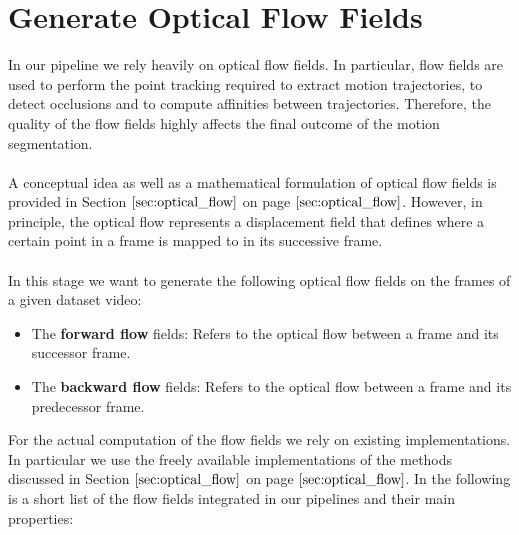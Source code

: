 \section{Generate Optical Flow Fields}
\label{sec:generate_of}
In our pipeline we rely heavily on optical flow fields. In particular, flow fields are used to perform the point tracking required to extract motion trajectories, to detect occlusions and to compute affinities between trajectories. Therefore, the quality of the flow fields highly affects the final outcome of the motion segmentation. \\ \\
A conceptual idea as well as a mathematical formulation of optical flow fields is provided in Section $\ref{sec:optical_flow}$ on page $\pageref{sec:optical_flow}$. However, in principle, the optical flow represents a displacement field that defines where a certain point in a frame is mapped to in its successive frame. \\ \\
In this stage we want to generate the following optical flow fields on the frames of a given dataset video:
\begin{itemize}
	\item The \textbf{forward flow} fields: Refers to the optical flow between a frame and its successor frame.
	\item The \textbf{backward flow} fields: Refers to the optical flow between a frame and its predecessor frame.
\end{itemize}
For the actual computation of the flow fields we rely on existing implementations. In particular we use the freely available implementations of the methods discussed in Section $\ref{sec:optical_flow}$ on page $\pageref{sec:optical_flow}$. In the following is a short list of the flow fields integrated in our pipelines and their main properties:
